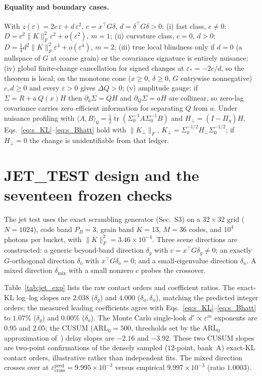 \documentclass[aps,prl,onecolumn,notitlepage,nofootinbib,superscriptaddress]{revtex4-2}
\newcommand{\tr}{\operatorname{tr}}
\newcommand{\eps}{\varepsilon}
\begin{document}
\paragraph*{Equality and boundary cases.}
With $z(\eps)=2c\,\eps+d\,\eps^2$, $c=x^{\!\top}G\delta$,
$d=\delta^{\!\top}G\delta>0$:
(i) fast class, $c\neq0$: $D=c^2\|K\|_F^2\eps^2+o(\eps^2)$, $m=1$;
(ii) curvature class, $c=0$, $d>0$: $D=\tfrac14 d^2\|K\|_F^2\eps^4+o(\eps^4)$,
$m=2$;
(iii) true local blindness only if $d=0$ (a nullspace of $G$ at coarse grain) or
the covariance signature is entirely nuisance;
(iv) global finite-change cancellation for signed changes at
$\eps_\ast=-2c/d$, so the theorem is local; on the monotone cone
($x\ge0$, $\delta\ge0$, $G$ entrywise nonnegative) $c,d\ge0$ and every $\eps>0$
gives $\Delta Q>0$;
(v) amplitude gauge: if $\Sigma=R+a\,Q(x)H$ then $\partial_a\Sigma=QH$ and
$\partial_Q\Sigma=aH$ are collinear, so zero-lag covariance carries zero
efficient information for separating $Q$ from $a$. Under nuisance profiling with
$\langle A,B\rangle_0=\tfrac12\tr(\Sigma_0^{-1}A\Sigma_0^{-1}B)$ and
$H_\perp=(I-\Pi_\eta)H$, Eqs.~\eqref{eq:s_KL}--\eqref{eq:s_Bhatt} hold with
$\|K_\perp\|_F$, $K_\perp=\Sigma_0^{-1/2}H_\perp\Sigma_0^{-1/2}$; if $H_\perp=0$
the change is unidentifiable from that ledger.

\section{JET\_TEST design and the seventeen frozen checks}
The jet test uses the exact scrambling generator (Sec.~S3) on a $32\times32$
grid ($N=1024$), code band $P_B=3$, grain band $K=13$, $M=36$ codes, and $10^4$
photons per bucket, with $\|K\|_F^2=3.46\times10^{-4}$. Three scene directions
are constructed: a generic beyond-band direction $\delta_g$ with
$c=x^{\!\top}G\delta_g\neq0$; an exactly $G$-orthogonal direction $\delta_o$ with
$x^{\!\top}G\delta_o=0$; and a small-eigenvalue direction $\delta_n$. A mixed
direction $\delta_{\mathrm{mix}}$ with a small nonzero $c$ probes the crossover.

Table~\ref{tab:jet_exp} lists the raw contact orders and coefficient ratios.
The exact-KL log--log slopes are $2.038$ ($\delta_g$) and $4.000$
($\delta_o,\delta_n$), matching the predicted integer orders; the measured
leading coefficients agree with Eqs.~\eqref{eq:s_KL}--\eqref{eq:s_Bhatt} to
$1.07\%$ ($\delta_g$) and $0.00\%$ ($\delta_o$). The Monte Carlo single-look
$d'\!\propto\!\eps^{m}$ exponents are $0.95$ and $2.05$; the CUSUM
($\mathrm{ARL}_0=500$, thresholds set by the ARL$_0$ approximation
of~\cite{s_Siegmund}) delay slopes are $-2.16$ and $-3.92$. These two CUSUM slopes
are two-point confirmations of the densely sampled ($12$-point, bank~A) exact-KL
contact orders, illustrative rather than independent fits. The mixed direction
crosses over at $\eps_{\mathrm{cross}}^{\mathrm{pred}}=9.995\times10^{-3}$ versus
empirical $9.997\times10^{-3}$ (ratio $1.0003$).
\end{document}
